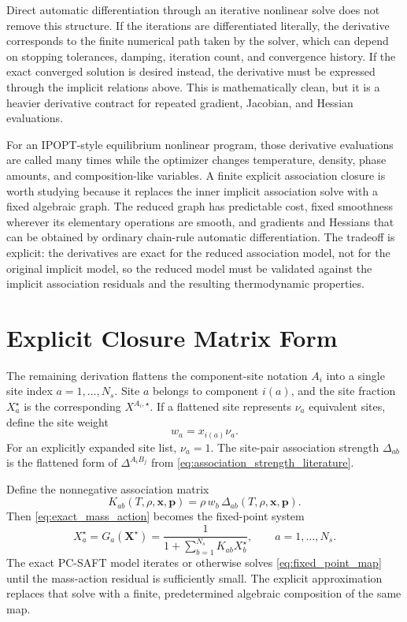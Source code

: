 \documentclass[12pt,letterpaper]{article}
\begin{document}
Direct automatic differentiation through an iterative nonlinear solve does not
remove this structure. If the iterations are differentiated literally, the
derivative corresponds to the finite numerical path taken by the solver, which
can depend on stopping tolerances, damping, iteration count, and convergence
history. If the exact converged solution is desired instead, the derivative
must be expressed through the implicit relations above. This is mathematically
clean, but it is a heavier derivative contract for repeated gradient, Jacobian,
and Hessian evaluations.

For an IPOPT-style equilibrium nonlinear program, those derivative evaluations
are called many times while the optimizer changes temperature, density, phase
amounts, and composition-like variables. A finite explicit association closure
is worth studying because it replaces the inner implicit association solve with
a fixed algebraic graph. The reduced graph has predictable cost, fixed
smoothness wherever its elementary operations are smooth, and gradients and
Hessians that can be obtained by ordinary chain-rule automatic
differentiation. The tradeoff is explicit: the derivatives are exact for the
reduced association model, not for the original implicit model, so the reduced
model must be validated against the implicit association residuals and the
resulting thermodynamic properties.

\section{Explicit Closure Matrix Form}

The remaining derivation flattens the component-site notation \(A_i\) into a
single site index \(a=1,\dots,N_s\). Site \(a\) belongs to component \(i(a)\),
and the site fraction \(X_a^\star\) is the corresponding
\(X^{A_i,\star}\). If a flattened site represents \(\nu_a\) equivalent sites,
define the site weight
\begin{equation}
    w_a=x_{i(a)}\nu_a .
    \label{eq:site_weight}
\end{equation}
For an explicitly expanded site list, \(\nu_a=1\). The site-pair association
strength \(\Delta_{ab}\) is the flattened form of
\(\Delta^{A_iB_j}\) from \eqref{eq:association_strength_literature}.

Define the nonnegative association matrix
\begin{equation}
    K_{ab}(T,\rho,\mathbf{x},\mathbf{p})
    =
    \rho\,w_b\,\Delta_{ab}(T,\rho,\mathbf{x},\mathbf{p}) .
    \label{eq:k_matrix}
\end{equation}
Then \eqref{eq:exact_mass_action} becomes the fixed-point system
\begin{equation}
    X_a^\star = G_a(\mathbf{X}^\star)
    =
    \frac{1}{1+\sum_{b=1}^{N_s}K_{ab}X_b^\star},
    \qquad a=1,\dots,N_s .
    \label{eq:fixed_point_map}
\end{equation}
The exact PC-SAFT model iterates or otherwise solves \eqref{eq:fixed_point_map}
until the mass-action residual is sufficiently small. The explicit
approximation replaces that solve with a finite, predetermined algebraic
composition of the same map.
\end{document}
